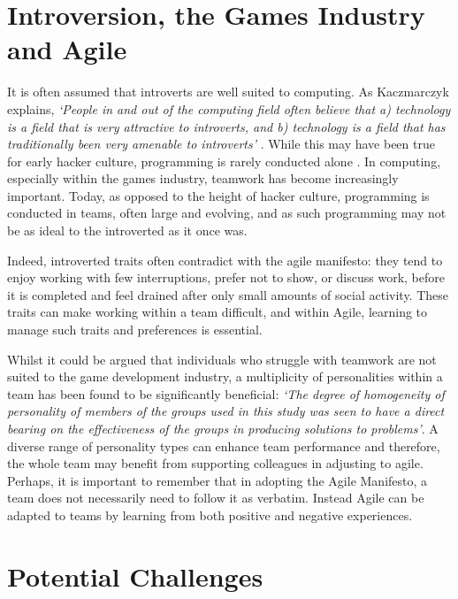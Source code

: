 \documentclass{scrartcl}
\begin{document}
\section{Introversion, the Games Industry and Agile}

It is often assumed that introverts are well suited to computing. As Kaczmarczyk explains, \textit{`People in and out of the computing field often believe that a) technology is a field that is very attractive to introverts, and b) technology is a field that has traditionally been very amenable to introverts'} \cite[p. 24]{Kacz}. While this may have been true for early hacker culture, programming is rarely conducted alone \cite{Kacz}. In computing, especially within the games industry, teamwork has become increasingly important. Today, as opposed to the height of hacker culture, programming is conducted in teams, often large and evolving, and as such programming may not be as ideal to the introverted as it once was. 

Indeed, introverted traits often contradict with the agile manifesto: they tend to enjoy working with few interruptions, prefer not to show, or discuss work, before it is completed and feel drained after only small amounts of social activity\cite{Cain}.  These traits can make working within a team difficult, and within Agile, learning to manage such traits and preferences is essential.

Whilst it could be argued that individuals who struggle with teamwork are not suited to the game development industry, a multiplicity of personalities within a team has been found to be significantly beneficial: \textit{`The degree of homogeneity of personality of members of the groups used in this study was seen to have a direct bearing on the effectiveness of the groups in producing solutions to problems'}\cite[p. 27]{Hoffman}. A diverse range of personality types can enhance team performance and therefore, the whole team may benefit from supporting colleagues in adjusting to agile. Perhaps, it is important to remember that in adopting the Agile Manifesto, a team does not necessarily need to follow it as verbatim. Instead Agile can be adapted to teams by learning from both positive and negative experiences. 

\section{Potential Challenges}
\end{document}
